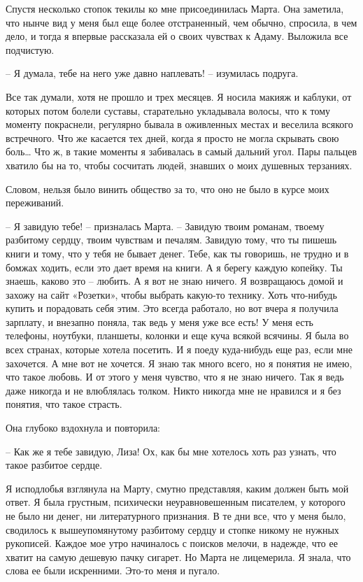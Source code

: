 \documentclass[
]{book}
\begin{document}
Спустя несколько стопок текилы ко мне присоединилась Марта. Она заметила, что нынче вид у меня был еще более отстраненный, чем обычно, спросила, в чем дело, и тогда я впервые рассказала ей о своих чувствах к Адаму. Выложила все подчистую.

-- Я думала, тебе на него уже давно наплевать! -- изумилась подруга.

Все так думали, хотя не прошло и трех месяцев. Я носила макияж и каблуки, от которых потом болели суставы, старательно укладывала волосы, что к тому моменту покраснели, регулярно бывала в оживленных местах и веселила всякого встречного. Что же касается тех дней, когда я просто не могла скрывать свою боль\ldots{} Что ж, в такие моменты я забивалась в самый дальний угол. Пары пальцев хватило бы на то, чтобы сосчитать людей, знавших о моих душевных терзаниях.

Словом, нельзя было винить общество за то, что оно не было в курсе моих переживаний.

-- Я завидую тебе! -- призналась Марта. -- Завидую твоим романам, твоему разбитому сердцу, твоим чувствам и печалям. Завидую тому, что ты пишешь книги и тому, что у тебя не бывает денег. Тебе, как ты говоришь, не трудно и в бомжах ходить, если это дает время на книги. А я берегу каждую копейку. Ты знаешь, каково это -- любить. А я вот не знаю ничего. Я возвращаюсь домой и захожу на сайт «Розетки», чтобы выбрать какую-то технику. Хоть что-нибудь купить и порадовать себя этим. Это всегда работало, но вот вчера я получила зарплату, и внезапно поняла, так ведь у меня уже все есть! У меня есть телефоны, ноутбуки, планшеты, колонки и еще куча всякой всячины. Я была во всех странах, которые хотела посетить. И я поеду куда-нибудь еще раз, если мне захочется. А мне вот не хочется. Я знаю так много всего, но я понятия не имею, что такое любовь. И от этого у меня чувство, что я не знаю ничего. Так я ведь даже никогда и не влюблялась толком. Никто никогда мне не нравился и я без понятия, что такое страсть.

Она глубоко вздохнула и повторила:

-- Как же я тебе завидую, Лиза! Ох, как бы мне хотелось хоть раз узнать, что такое разбитое сердце.

Я исподлобья взглянула на Марту, смутно представляя, каким должен быть мой ответ. Я была грустным, психически неуравновешенным писателем, у которого не было ни денег, ни литературного признания. В те дни все, что у меня было, сводилось к вышеупомянутому разбитому сердцу и стопке никому не нужных рукописей. Каждое мое утро начиналось с поисков мелочи, в надежде, что ее хватит на самую дешевую пачку сигарет. Но Марта не лицемерила. Я знала, что слова ее были искренними. Это-то меня и пугало.
\end{document}
